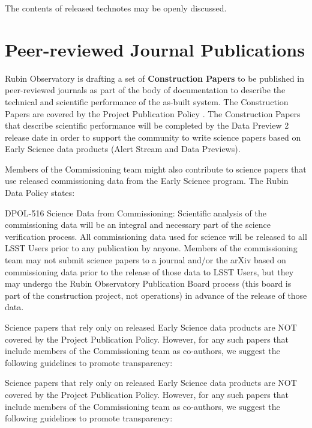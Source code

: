 \documentclass[SE,authoryear,toc,lsstdraft]{lsstdoc}
\begin{document}
The contents of released technotes may be openly discussed.

\section{Peer-reviewed Journal Publications}

Rubin Observatory is drafting a set of \textbf{Construction Papers} to be published in peer-reviewed journals as part of the body of documentation to describe the technical and scientific performance of the as-built system.
The Construction Papers are covered by the Project Publication Policy .
The Construction Papers that describe scientific performance will be completed by the Data Preview 2 release date in order to support the community to write science papers based on Early Science data products (Alert Stream and Data Previews).

Members of the Commissioning team might also contribute to science papers that use released commissioning data from the Early Science program. The Rubin Data Policy  states:

\begin{emph}
  DPOL-516 Science Data from Commissioning: Scientific analysis of the commissioning data will be an integral and necessary part of the science verification process.
  All commissioning data used for science will be released to all LSST Users prior to any publication by anyone.
  Members of the commissioning team may not submit science papers to a journal and/or the arXiv based on commissioning data prior to the release of those data to LSST Users, but they may undergo the Rubin Observatory Publication Board process (this board is part of the construction project, not operations) in advance of the release of those data.
\end{emph}

Science papers that rely only on released Early Science data products are NOT covered by the Project Publication Policy.
However, for any such papers that include members of the Commissioning team as co-authors, we suggest the following guidelines to promote transparency:

Science papers that rely only on released Early Science data products are NOT covered by the Project Publication Policy.
However, for any such papers that include members of the Commissioning team as co-authors, we suggest the following guidelines to promote transparency:
\end{document}
